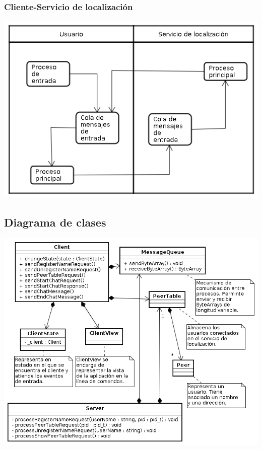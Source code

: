 \subsubsection{Cliente-Servicio de localización}
\begin{center}
\small\includegraphics[scale=0.65]{./Images/ArquitecturaClienteConServidor}
\end{center}

\subsection{Diagrama de clases}
\begin{center}
\small\includegraphics[scale=0.65]{./Images/DiagramaDeClases}
\end{center}

